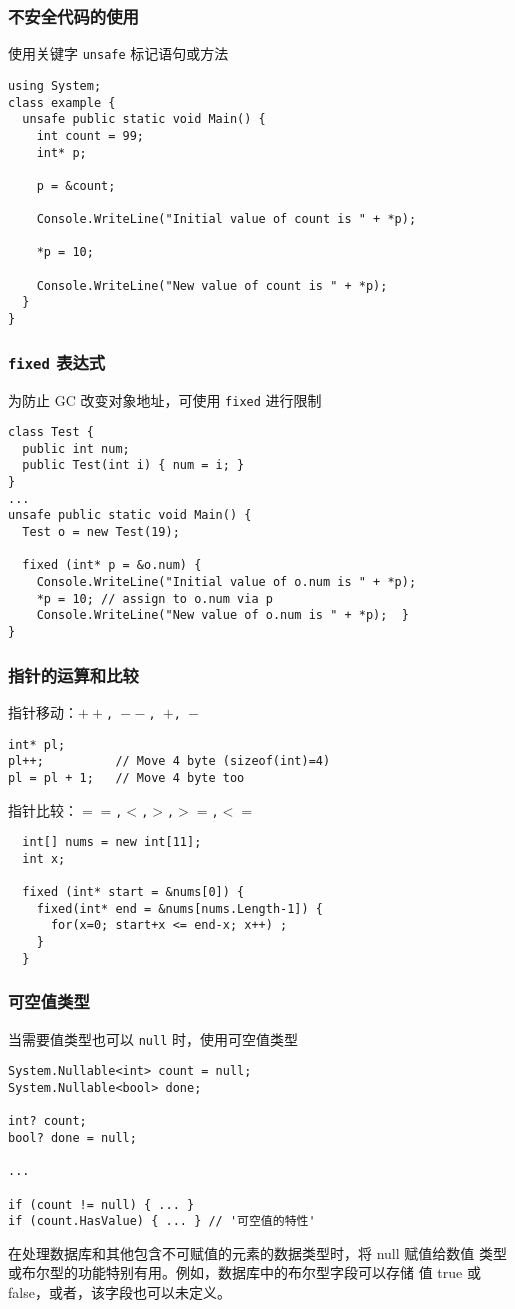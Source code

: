 \begin{frame}[fragile]
\frametitle{不安全代码的使用}
使用关键字 \texttt{unsafe} 标记语句或方法
\begin{lstlisting}
using System;
class example {
  unsafe public static void Main() {
    int count = 99;
    int* p;

    p = &count;

    Console.WriteLine("Initial value of count is " + *p);

    *p = 10;

    Console.WriteLine("New value of count is " + *p);
  }
}
\end{lstlisting}
\end{frame}

\begin{frame}[fragile]
\frametitle{\texttt{fixed} 表达式}
为防止 GC 改变对象地址，可使用 \texttt{fixed} 进行限制
\begin{lstlisting}
class Test {
  public int num;
  public Test(int i) { num = i; }
}
...
unsafe public static void Main() {
  Test o = new Test(19);

  fixed (int* p = &o.num) {
    Console.WriteLine("Initial value of o.num is " + *p);
    *p = 10; // assign to o.num via p
    Console.WriteLine("New value of o.num is " + *p);  }
}
\end{lstlisting}
\end{frame}

\begin{frame}[fragile]
\frametitle{指针的运算和比较}
指针移动：\texttt{$++$, $--$, $+$, $-$}
\begin{lstlisting}
int* pl;
pl++;          // Move 4 byte (sizeof(int)=4)
pl = pl + 1;   // Move 4 byte too
\end{lstlisting}
指针比较：\texttt{$==$,$<$,$>$,$>=$,$<=$}
\begin{lstlisting}
  int[] nums = new int[11];
  int x;

  fixed (int* start = &nums[0]) {
    fixed(int* end = &nums[nums.Length-1]) {
      for(x=0; start+x <= end-x; x++) ;
    }
  }

\end{lstlisting}
\end{frame}

\begin{frame}[fragile]
\frametitle{可空值类型}
当需要值类型也可以 \texttt{null} 时，使用可空值类型

\begin{lstlisting}[escapeinside='']
System.Nullable<int> count = null;
System.Nullable<bool> done;

int? count;
bool? done = null;

...

if (count != null) { ... }
if (count.HasValue) { ... } // '可空值的特性'
\end{lstlisting}

\CJKindent 在处理数据库和其他包含不可赋值的元素的数据类型时，将 null 赋值给数值
类型或布尔型的功能特别有用。例如，数据库中的布尔型字段可以存储
值 true 或 false，或者，该字段也可以未定义。
\end{frame}

